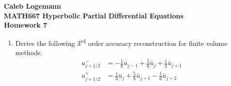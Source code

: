 \documentclass[11pt, oneside]{article}
\begin{document}
\noindent \textbf{\Large{Caleb Logemann \\
MATH667 Hyperbolic Partial Differential Equations \\
Homework 7
}}

%
\begin{enumerate}
  \item %
    Derive the following 3\textsuperscript{rd} order accuracy reconstruction
    for finite volume methods.
    \begin{align*}
      u_{j+1/2}^- &= -\frac{1}{6} \bar{u}_{j-1} + \frac{5}{6}\bar{u}_j + \frac{1}{3}\bar{u}_{j+1} \\
      u_{j+1/2}^+ &= \frac{1}{3} \bar{u}_{j} + \frac{5}{6}\bar{u}_{j+1} - \frac{1}{6}\bar{u}_{j+2}
    \end{align*}


\end{enumerate}
\end{document}
